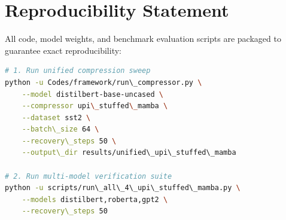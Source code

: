 \section{Reproducibility Statement}
All code, model weights, and benchmark evaluation scripts are packaged to guarantee exact reproducibility:
\begin{lstlisting}[language=bash]
# 1. Run unified compression sweep
python -u Codes/framework/run\_compressor.py \
    --model distilbert-base-uncased \
    --compressor upi\_stuffed\_mamba \
    --dataset sst2 \
    --batch\_size 64 \
    --recovery\_steps 50 \
    --output\_dir results/unified\_upi\_stuffed\_mamba

# 2. Run multi-model verification suite
python -u scripts/run\_all\_4\_upi\_stuffed\_mamba.py \
    --models distilbert,roberta,gpt2 \
    --recovery\_steps 50
\end{lstlisting}
